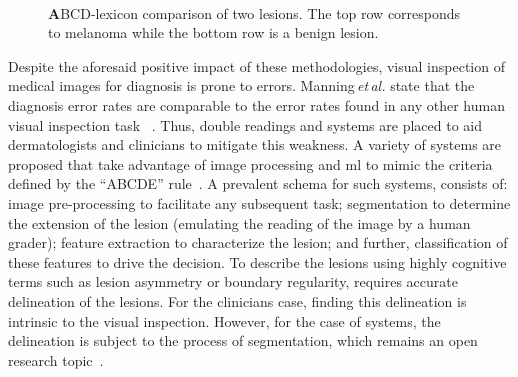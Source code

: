\begin{figure}
\begin{center}
    \hfill
    \hfill
    \hfill
  \hspace*{\fill}\\
    \caption{{\textbf ABCD}-lexicon comparison of two lesions. The top row corresponds to melanoma while the bottom row is a benign lesion.}
  \label{fig:lexicon}
\end{center}
\end{figure}
%

Despite the aforesaid positive impact of these methodologies, visual inspection of medical images for diagnosis is prone to errors.
Manning\,\emph{et\,al.} state that the diagnosis error rates are comparable to the error rates found in any other human visual inspection task ~\cite{manning2014perception}.
Thus, double readings and \cad systems are placed to aid dermatologists and clinicians to mitigate this weakness.
A variety of \cad systems are proposed that take advantage of image processing and \ac{ml} to mimic the criteria defined by the ``ABCDE'' rule~\cite{rastgoo2015automatic}.
A prevalent schema for such \cad systems, consists of: image pre-processing to facilitate any subsequent task; segmentation to determine the extension of the lesion (emulating the reading of the image by a human grader); feature extraction to characterize the lesion; and further, classification of these features to drive the decision.
To describe the lesions using highly cognitive terms such as lesion asymmetry or boundary regularity, requires accurate delineation of the lesions. For the clinicians case, finding this delineation is intrinsic to the visual inspection. However, for the case of \cad systems, the delineation is subject to the process of segmentation, which remains an open research topic~\cite{duncan2000medical}.

